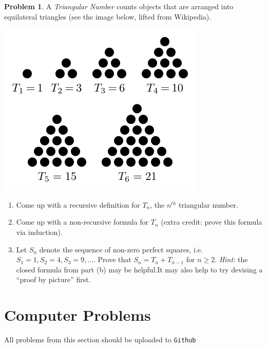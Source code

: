 \documentclass[10pt]{article}
\numberwithin{pic}{section}
\numberwithin{lem}{section}
\numberwithin{thm}{section}
\numberwithin{cor}{section}
\theoremstyle{definition}
\numberwithin{ex}{section}
\numberwithin{defn}{section}
\theoremstyle{definition}
\newtheorem{prob}{Problem}
\numberwithin{prob}{section}
\theoremstyle{remark}
\theoremstyle{plain}
\numberwithin{claim}{prob}
\begin{document}
\begin{prob}
  A \textit{Triangular Number} counts objects that are arranged into equilateral triangles (see the image below, lifted from Wikipedia).\\
  \begin{center}
    \includegraphics[scale=0.5]{TriNums}
  \end{center}
  \begin{enumerate}
  \item Come up with a recursive definition for $T_n$, the $n^{th}$ triangular number.
  \item Come up with a non-recursive formula for $T_n$ (extra credit: prove this formula via induction).
  \item Let $S_n$ denote the sequence of non-zero perfect squares, i.e. $S_1 =
    1, S_2 = 4, S_3 = 9, ...$. Prove that $S_n = T_n + T_{n-1}$ for $n \geq 2$.
    \textit{Hint:} the closed formula from part (b) may be helpful.It may also
    help to try devising a ``proof by picture'' first.
  \end{enumerate}
\end{prob}
\section{Computer Problems}
\begin{center}
  All problems from this section should be uploaded to \texttt{Github}
\end{center}
\end{document}
